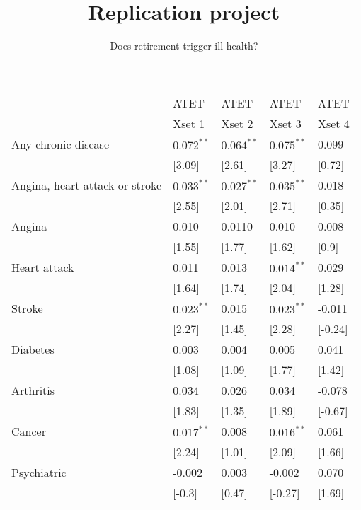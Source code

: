 \documentclass[12pt]{article}
\title{\vspace{-8ex} Replication project \vspace{-2ex}}
\author{Does retirement trigger ill health?}
\date{\vspace{-4ex}}
\begin{document}
\maketitle

\begin{tabular}{lllll}
    \toprule
     & ATET & ATET & ATET & ATET \\
     & Xset 1 & Xset 2 & Xset 3 & Xset 4 \\
    \midrule
    Any chronic disease & $0.072^{**}$ & $0.064^{**}$ & $0.075^{**}$ & 0.099 \\
     & [3.09] & [2.61] & [3.27] & [0.72] \\
    Angina, heart attack or stroke & $0.033^{**}$ & $0.027^{**}$ & $0.035^{**}$ & 0.018 \\
     & [2.55] & [2.01] & [2.71] & [0.35] \\
    Angina & 0.010 & 0.0110 & 0.010 & 0.008 \\
     & [1.55] & [1.77] & [1.62] & [0.9] \\
    Heart attack & 0.011 & 0.013 & $0.014^{**}$ & 0.029 \\
     & [1.64] & [1.74] & [2.04] & [1.28] \\
    Stroke & $0.023^{**}$ & 0.015 & $0.023^{**}$ & -0.011 \\
     & [2.27] & [1.45] & [2.28] & [-0.24] \\
    Diabetes & 0.003 & 0.004 & 0.005 & 0.041 \\
     & [1.08] & [1.09] & [1.77] & [1.42] \\
    Arthritis & 0.034 & 0.026 & 0.034 & -0.078 \\
     & [1.83] & [1.35] & [1.89] & [-0.67] \\
    Cancer & $0.017^{**}$ & 0.008 & $0.016^{**}$ & 0.061 \\
     & [2.24] & [1.01] & [2.09] & [1.66] \\
    Psychiatric & -0.002 & 0.003 & -0.002 & 0.070 \\
     & [-0.3] & [0.47] & [-0.27] & [1.69] \\
    \bottomrule
    \end{tabular}
\end{document}

